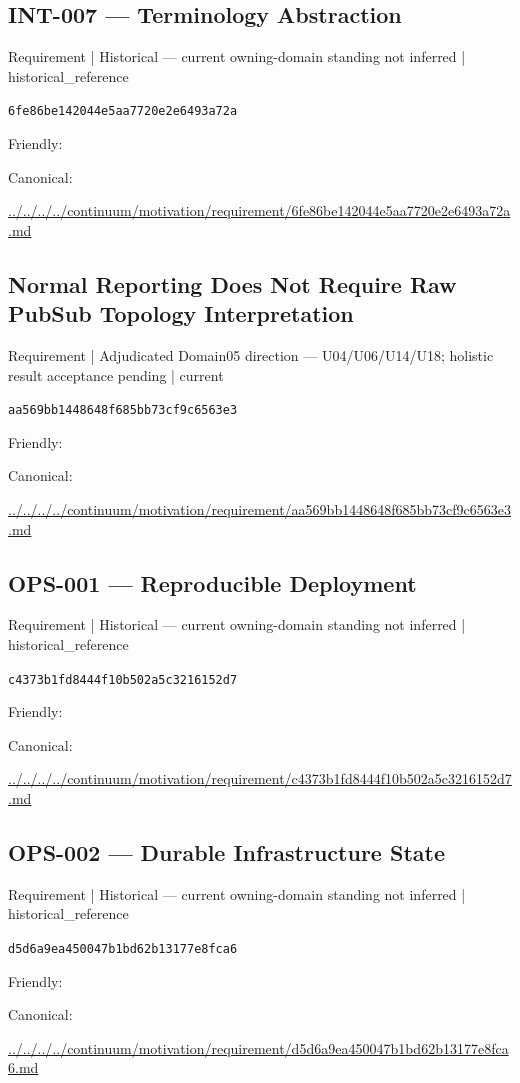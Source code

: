 \documentclass[10pt,a4paper]{article}
\begin{document}
\subsection*{INT-007 — Terminology Abstraction}
{\small Requirement | Historical — current owning-domain standing not inferred | historical\_reference}\par
\texttt{6fe86be142044e5aa7720e2e6493a72a}\par
Friendly: \par
Canonical: \par
{\footnotesize\url{../../../../continuum/motivation/requirement/6fe86be142044e5aa7720e2e6493a72a.md}}\par
\subsection*{Normal Reporting Does Not Require Raw PubSub Topology Interpretation}
{\small Requirement | Adjudicated Domain05 direction — U04/U06/U14/U18; holistic result acceptance pending | current}\par
\texttt{aa569bb1448648f685bb73cf9c6563e3}\par
Friendly: \par
Canonical: \par
{\footnotesize\url{../../../../continuum/motivation/requirement/aa569bb1448648f685bb73cf9c6563e3.md}}\par
\subsection*{OPS-001 — Reproducible Deployment}
{\small Requirement | Historical — current owning-domain standing not inferred | historical\_reference}\par
\texttt{c4373b1fd8444f10b502a5c3216152d7}\par
Friendly: \par
Canonical: \par
{\footnotesize\url{../../../../continuum/motivation/requirement/c4373b1fd8444f10b502a5c3216152d7.md}}\par
\subsection*{OPS-002 — Durable Infrastructure State}
{\small Requirement | Historical — current owning-domain standing not inferred | historical\_reference}\par
\texttt{d5d6a9ea450047b1bd62b13177e8fca6}\par
Friendly: \par
Canonical: \par
{\footnotesize\url{../../../../continuum/motivation/requirement/d5d6a9ea450047b1bd62b13177e8fca6.md}}\par
\end{document}

